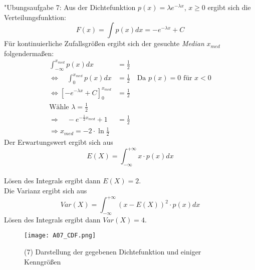 \documentclass[fleqn,a4paper,12pt]{article}
\begin{document}
	"Ubungsaufgabe 7: \newline
	Aus der Dichtefunktion $p(x) = \lambda e^{-\lambda x}$, $x \geq 0$ ergibt sich die Verteilungsfunktion: \[F(x) = \int p(x) dx = -e^{-\lambda x} + C\]
	Für kontinuierliche Zufallsgrößen ergibt sich der gesuchte \textit{Median} $x_{med}$ folgendermaßen:
	\begin{align*}
	\int_{-\infty}^{x_{med}} p(x) dx &= \frac{1}{2} \\
	\Leftrightarrow \quad \int_0^{x_{med}} p(x) dx &= \frac{1}{2} \quad \text{Da }  p(x) = 0 \text{ für } x < 0 \\
	\Leftrightarrow \left[ -e^{-\lambda x} + C \right]_{0}^{x_{med}} &= \frac{1}{2} \\
	\text{Wähle } \lambda = \frac{1}{2} \\
	\Rightarrow \quad -e^{-\frac{1}{2}x_{med}} + 1 &= \frac{1}{2} \\
	\Rightarrow x_{med} = -2 \cdot \ln \frac{1}{2}
	\end{align*}
	Der Erwartungswert ergibt sich aus \[E(X) = \int_{-\infty}^{+\infty} x \cdot  p(x) dx\] \\
	Lösen des Integrals ergibt dann $E(X) = 2$. \\
	Die Varianz ergibt sich aus \[\textit{Var}(X) = \int_{-\infty}^{+\infty} ( x - E(X) )^2 \cdot p(x) dx\]
	Lösen des Integrals ergibt dann $\textit{Var}(X) = 4$.
	\begin{figure}
		\texttt{[image: A07\_CDF.png]}
		\caption{(7) Darstellung der gegebenen Dichtefunktion und einiger Kenngrößen}
	\end{figure}
\end{document}
